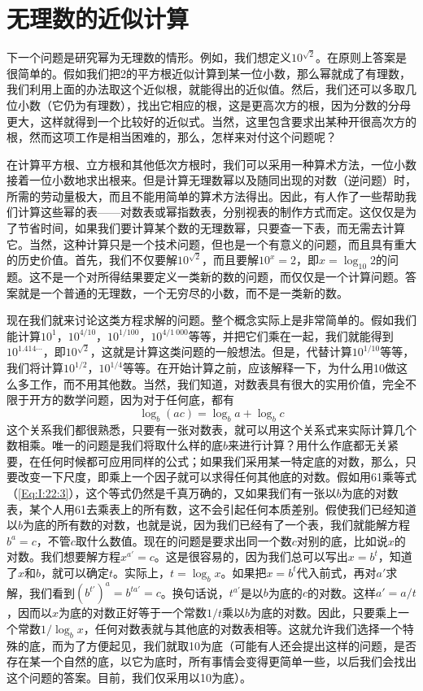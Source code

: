 \section{无理数的近似计算}

下一个问题是研究幂为无理数的情形。例如，我们想定义$10^{\sqrt{2}}$。在原则上答案是很简单的。假如我们把2的平方根近似计算到某一位小数，那么幂就成了有理数，我们利用上面的办法取这个近似根，就能得出的近似值。然后，我们还可以多取几位小数（它仍为有理数），找出它相应的根，这是更高次方的根，因为分数的分母更大，这样就得到一个比较好的近似式。当然，这里包含要求出某种开很高次方的根，然而这项工作是相当困难的，那么，怎样来对付这个问题呢？

在计算平方根、立方根和其他低次方根时，我们可以采用一种算术方法，一位小数接着一位小数地求出根来。但是计算无理数幂以及随同出现的对数（逆问题）时，所需的劳动量极大，而且不能用简单的算术方法得出。因此，有人作了一些帮助我们计算这些幂的表——对数表或幂指数表，分别视表的制作方式而定。这仅仅是为了节省时间，如果我们要计算某个数的无理数幂，只要查一下表，而无需去计算它。当然，这种计算只是一个技术问题，但也是一个有意义的问题，而且具有重大的历史价值。首先，我们不仅要解$10^{\sqrt{2}}$，而且要解$10^x=2$，即$x=\log_{10}2$的问题。这不是一个对所得结果要定义一类新的数的问题，而仅仅是一个计算问题。答案就是一个普通的无理数，一个无穷尽的小数，而不是一类新的数。

现在我们就来讨论这类方程求解的问题。整个概念实际上是非常简单的。假如我们能计算$10^1$，$10^{4/10}$，$10^{1/100}$，$10^{4/1~000}$等等，并把它们乘在一起，我们就能得到$10^{1.414\cdots}$，即$10^{\sqrt{2}}$，这就是计算这类问题的一般想法。但是，代替计算$10^{1/10}$等等，我们将计算$10^{1/2}$，$10^{1/4}$等等。在开始计算之前，应该解释一下，为什么用10做这么多工作，而不用其他数。当然，我们知道，对数表具有很大的实用价值，完全不限于开方的数学问题，因为对于任何底，都有
\begin{equation}
    \label{Eq:I:22:3}
    \log_b(ac)=\log_ba+\log_bc
\end{equation}
这个关系我们都很熟悉，只要有一张对数表，就可以用这个关系式来实际计算几个数相乘。唯一的问题是我们将取什么样的底$b$来进行计算？用什么作底都无关紧要，在任何时候都可应用同样的公式；如果我们采用某一特定底的对数，那么，只要改变一下尺度，即乘上一个因子就可以求得任何其他底的对数。假如用61乘等式（\ref{Eq:I:22:3}），这个等式仍然是千真万确的，又如果我们有一张以$b$为底的对数表，某个人用61去乘表上的所有数，这不会引起任何本质差别。假使我们已经知道以$b$为底的所有数的对数，也就是说，因为我们已经有了一个表，我们就能解方程$b^a=c$，不管$c$取什么数值。现在的问题是要求出同一个数$c$对别的底，比如说$x$的对数。我们想要解方程$x^{a'}=c$。这是很容易的，因为我们总可以写出$x=b^t$，知道了$x$和$b$，就可以确定$t$。实际上，$t=\log_bx$。如果把$x=b^t$代入前式，再对$a'$求解，我们看到$(b^{t'})^a=b^{ta'}=c$。换句话说，$t^{a'}$是以$b$为底的$c$的对数。这样$a'=a/t$，因而以$x$为底的对数正好等于一个常数$1/t$乘以$b$为底的对数。因此，只要乘上一个常数$1/\log_bx$，任何对数表就与其他底的对数表相等。这就允许我们选择一个特殊的底，而为了方便起见，我们就取10为底（可能有人还会提出这样的问题，是否存在某一个自然的底，以它为底时，所有事情会变得更简单一些，以后我们会找出这个问题的答案。目前，我们仅采用以10为底）。

